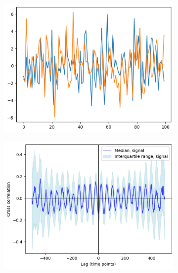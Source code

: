 \begin{figure}
  \begin{subfigure}[t]{0.5\textwidth}
  \centering
    \includegraphics[width=\linewidth]{sinusoid_and_fitzhughnagumo_gillnoise.png}
    \caption{
    }
    \label{fig:xcf-gillnoise-ts}
  \end{subfigure}%
  \centering
  \begin{subfigure}[t]{0.5\textwidth}
  \centering
    \includegraphics[width=\linewidth]{randomshift_sinusoid_fitzhughnagumo_gillnoise_xcf.png}
    \caption{
    }
    \label{fig:xcf-gillnoise-xcf}
  \end{subfigure}


\end{figure}
